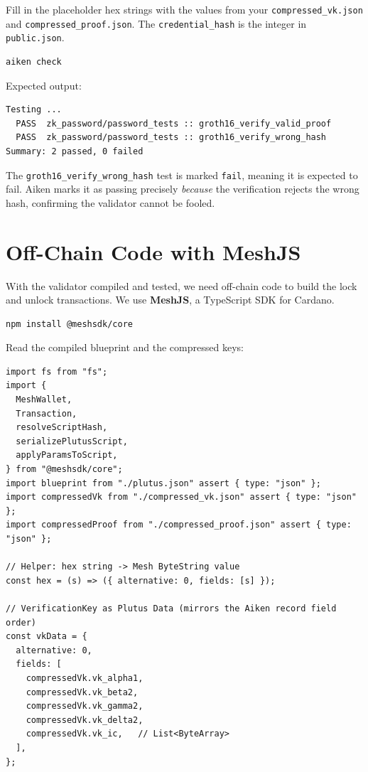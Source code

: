 Fill in the placeholder hex strings with the values from your
\texttt{compressed\_vk.json} and \texttt{compressed\_proof.json}.
The \texttt{credential\_hash} is the integer in \texttt{public.json}.

\begin{verbatim}
aiken check
\end{verbatim}

Expected output:

\begin{verbatim}
Testing ...
  PASS  zk_password/password_tests :: groth16_verify_valid_proof
  PASS  zk_password/password_tests :: groth16_verify_wrong_hash
Summary: 2 passed, 0 failed
\end{verbatim}

\begin{remark}
The \texttt{groth16\_verify\_wrong\_hash} test is marked \texttt{fail}, meaning
it is expected to fail. Aiken marks it as passing precisely \emph{because} the
verification rejects the wrong hash, confirming the validator cannot be
fooled.
\end{remark}

\section{Off-Chain Code with MeshJS} \label{sec:ch6-offchain}

With the validator compiled and tested, we need off-chain code to build the
lock and unlock transactions. We use \textbf{MeshJS}, a TypeScript SDK for
Cardano.

\begin{verbatim}
npm install @meshsdk/core
\end{verbatim}

Read the compiled blueprint and the compressed keys:

\begin{verbatim}
import fs from "fs";
import {
  MeshWallet,
  Transaction,
  resolveScriptHash,
  serializePlutusScript,
  applyParamsToScript,
} from "@meshsdk/core";
import blueprint from "./plutus.json" assert { type: "json" };
import compressedVk from "./compressed_vk.json" assert { type: "json" };
import compressedProof from "./compressed_proof.json" assert { type: "json" };

// Helper: hex string -> Mesh ByteString value
const hex = (s) => ({ alternative: 0, fields: [s] });

// VerificationKey as Plutus Data (mirrors the Aiken record field order)
const vkData = {
  alternative: 0,
  fields: [
    compressedVk.vk_alpha1,
    compressedVk.vk_beta2,
    compressedVk.vk_gamma2,
    compressedVk.vk_delta2,
    compressedVk.vk_ic,   // List<ByteArray>
  ],
};
\end{verbatim}

